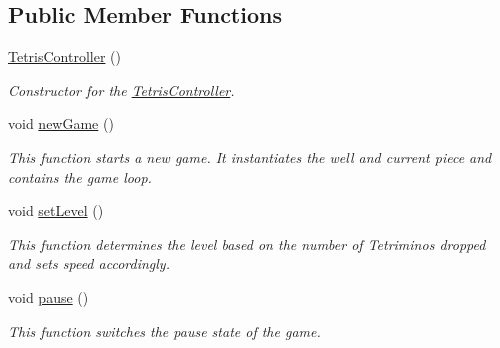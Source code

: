 \subsection*{Public Member Functions}
\begin{DoxyCompactItemize}
\item 
\hyperlink{class_project_tetris_1_1_group11_1_1_controller_1_1_tetris_controller_a4559dd5c986c8c0a1dc5e4da406196a0}{Tetris\+Controller} ()
\begin{DoxyCompactList}\small\item\em Constructor for the \hyperlink{class_project_tetris_1_1_group11_1_1_controller_1_1_tetris_controller}{Tetris\+Controller}. \end{DoxyCompactList}\item 
\hypertarget{class_project_tetris_1_1_group11_1_1_controller_1_1_tetris_controller_aedbc64c85a0081d8ec2921f81ef2eaf6}{}\label{class_project_tetris_1_1_group11_1_1_controller_1_1_tetris_controller_aedbc64c85a0081d8ec2921f81ef2eaf6} 
void \hyperlink{class_project_tetris_1_1_group11_1_1_controller_1_1_tetris_controller_aedbc64c85a0081d8ec2921f81ef2eaf6}{new\+Game} ()
\begin{DoxyCompactList}\small\item\em This function starts a new game. It instantiates the well and current piece and contains the game loop. \end{DoxyCompactList}\item 
\hypertarget{class_project_tetris_1_1_group11_1_1_controller_1_1_tetris_controller_a7735345ddbb540a588bc05c4f4efa3a4}{}\label{class_project_tetris_1_1_group11_1_1_controller_1_1_tetris_controller_a7735345ddbb540a588bc05c4f4efa3a4} 
void \hyperlink{class_project_tetris_1_1_group11_1_1_controller_1_1_tetris_controller_a7735345ddbb540a588bc05c4f4efa3a4}{set\+Level} ()
\begin{DoxyCompactList}\small\item\em This function determines the level based on the number of Tetriminos dropped and sets speed accordingly. \end{DoxyCompactList}\item 
\hypertarget{class_project_tetris_1_1_group11_1_1_controller_1_1_tetris_controller_a0ec05f8de4a6b4cebc8e9a1937be786c}{}\label{class_project_tetris_1_1_group11_1_1_controller_1_1_tetris_controller_a0ec05f8de4a6b4cebc8e9a1937be786c} 
void \hyperlink{class_project_tetris_1_1_group11_1_1_controller_1_1_tetris_controller_a0ec05f8de4a6b4cebc8e9a1937be786c}{pause} ()
\begin{DoxyCompactList}\small\item\em This function switches the pause state of the game. \end{DoxyCompactList}\item 

\end{DoxyCompactItemize}
